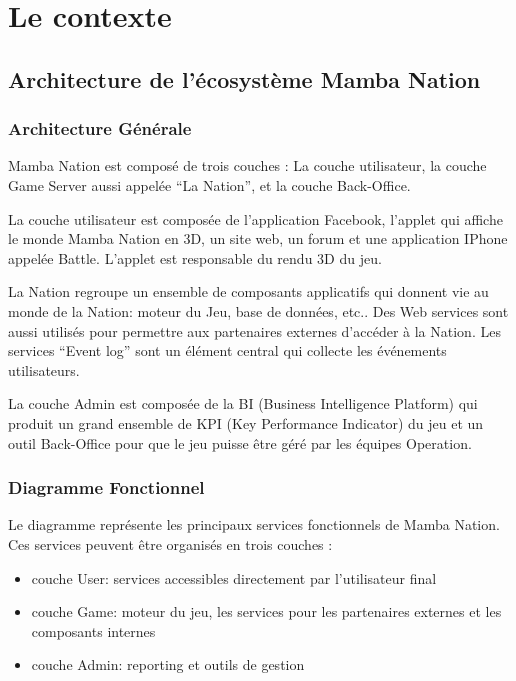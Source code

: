 
\chapter{Le contexte}
\section{Architecture de l'écosystème Mamba Nation}

\subsection{Architecture Générale}

Mamba Nation est composé de trois couches : La couche utilisateur, la couche
Game Server aussi appelée ``La Nation'', et la couche Back-Office.

La couche utilisateur est composée de l'application Facebook, l'applet qui
affiche le monde Mamba Nation en 3D, un site web, un forum et une application
IPhone appelée Battle.
L'applet est responsable du rendu 3D du jeu.

La Nation regroupe un ensemble de composants applicatifs qui donnent vie au
monde de la Nation: moteur du Jeu, base de données, etc.. Des Web services sont
aussi utilisés pour permettre aux partenaires externes d’accéder à la Nation.
Les services ``Event log'' sont un élément central qui collecte les événements
utilisateurs.

La couche Admin est composée de la BI (Business Intelligence Platform) qui
produit un grand ensemble de KPI (Key Performance Indicator) du jeu et un outil
Back-Office pour que le jeu puisse être géré par les équipes Operation.

\subsection{Diagramme Fonctionnel}

Le diagramme représente les principaux services fonctionnels de Mamba Nation.
Ces services peuvent être organisés en trois couches :
\begin{itemize}
\item couche User: services accessibles directement par l'utilisateur final
\item couche Game: moteur du jeu, les services pour les partenaires externes et les
  composants internes
\item couche Admin: reporting et outils de gestion
\end{itemize}

